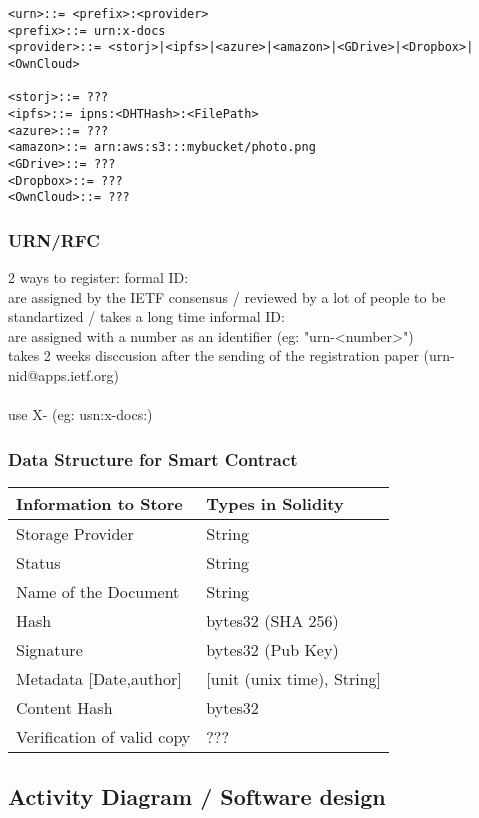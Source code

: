 \begin{verbatim}
<urn>::= <prefix>:<provider>
<prefix>::= urn:x-docs
<provider>::= <storj>|<ipfs>|<azure>|<amazon>|<GDrive>|<Dropbox>|<OwnCloud>

<storj>::= ???
<ipfs>::= ipns:<DHTHash>:<FilePath>
<azure>::= ???
<amazon>::= arn:aws:s3:::mybucket/photo.png
<GDrive>::= ???
<Dropbox>::= ???
<OwnCloud>::= ???
\end{verbatim}

\subsubsection{URN/RFC}

2 ways to register:
formal ID:\\
are assigned by the IETF consensus / reviewed by a lot of people to be standartized / takes a long time
informal ID: \\
are assigned with a number as an identifier (eg: "urn-<number>") \\
takes 2 weeks disccusion after the sending of the registration paper (urn-nid@apps.ietf.org)
\\
\\
use X- (eg: usn:x-docs:)

\subsubsection{Data Structure for Smart Contract}

\begin{tabular}{|l|l|}
\hline
	Information to Store & Types in Solidity\\
\hline
	Storage Provider & String\\
\hline
	Status & String\\
\hline
	Name of the Document  & String\\
\hline
	Hash & bytes32 (SHA 256)\\
\hline
	Signature & bytes32 (Pub Key)\\
\hline
	Metadata [Date,author] & [unit (unix time), String]\\
\hline
	Content Hash & bytes32\\
\hline
	Verification of valid copy & ???\\
\hline
\end{tabular}

\subsection{Activity Diagram / Software design}
